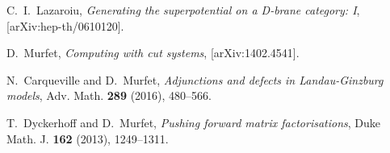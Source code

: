 \documentclass[english,letter paper,12pt,leqno]{article}
\theoremstyle{example}
\numberwithin{equation}{section}
\begin{document}

\providecommand{\bysame}{\leavevmode\hbox to3em{\hrulefill}\thinspace}
\providecommand{\href}[2]{#2}
\begin{thebibliography}{BHLS03}
  
C.~I.~Lazaroiu, \textsl{Generating the superpotential on a D-brane category: I}, [arXiv:hep-th/0610120].
  
D.~Murfet, \textsl{Computing with cut systems}, \href{http://arxiv.org/abs/1402.4541}{[arXiv:1402.4541]}.

N.~Carqueville and D.~Murfet, \textsl{Adjunctions and defects in Landau-Ginzburg models}, Adv. Math. \textbf{289} (2016), 480--566.

T.~Dyckerhoff and D.~Murfet, \textsl{Pushing forward matrix factorisations}, Duke Math. J. \textbf{162} (2013), 1249--1311.

\end{thebibliography}
\end{document}
